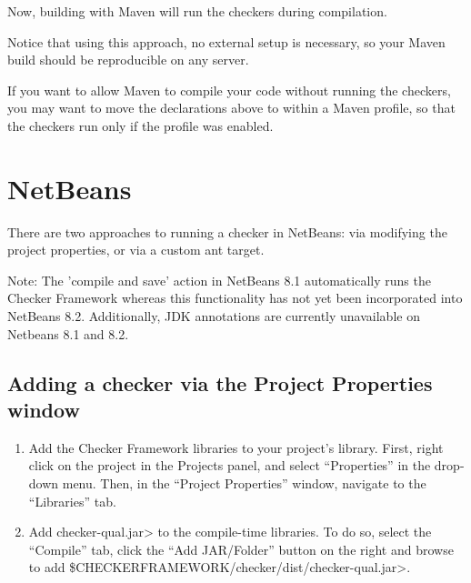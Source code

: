 {\begin{enumerate}
Now, building with Maven will run the checkers during compilation.

Notice that using this approach, no external setup is necessary,
so your Maven build should be reproducible on any server.

If you want to allow Maven to compile your code without running the
checkers, you may want to move the declarations above to within a Maven
profile, so that the checkers run only if the profile was enabled.

\end{enumerate}


\section{NetBeans\label{netbeans}}

There are two approaches to running a checker in NetBeans:  via modifying the
project properties, or via a custom ant target.

Note: The 'compile and save' action in NetBeans 8.1 automatically
runs the Checker Framework whereas this functionality has not yet
been incorporated into NetBeans 8.2. Additionally, JDK annotations
are currently unavailable on Netbeans 8.1 and 8.2.



\subsection{Adding a checker via the Project Properties window\label{netbeans-project-properties}}

\begin{enumerate}
\item
  Add the Checker Framework libraries to your project's
  library. First, right click on the project in the Projects panel,
  and select ``Properties'' in the drop-down menu. Then, in the
  ``Project Properties'' window, navigate to the ``Libraries'' tab.

\item
  Add \<checker-qual.jar> to the compile-time libraries. To do so,
  select the ``Compile'' tab, click the ``Add JAR/Folder'' button on
  the right and browse to
  add \<\$CHECKERFRAMEWORK/checker/dist/checker-qual.jar>.


\end{enumerate}}
